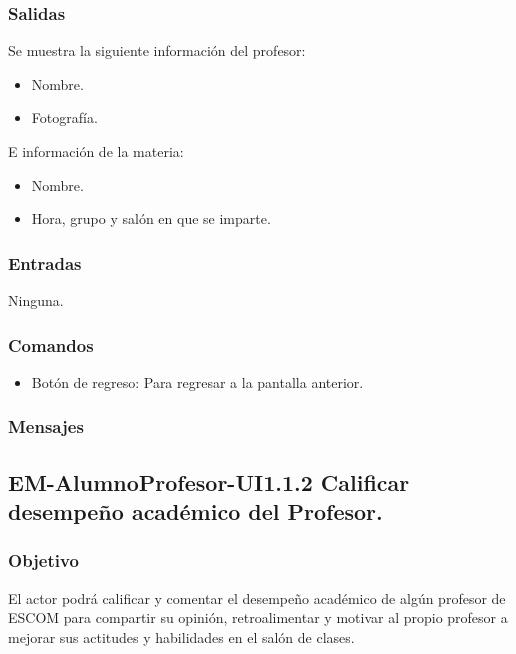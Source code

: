 \pagebreak
{}

\subsubsection{Salidas}
	\noindent
	Se muestra la siguiente información del profesor:
	\begin{itemize}
		\item Nombre.
		\item Fotografía. 
	\end{itemize}
	E información de la materia:
	\begin{itemize}
		\item Nombre.
		\item Hora, grupo y salón en que se imparte. 
	\end{itemize}

\subsubsection{Entradas}
	\noindent
	Ninguna.

\subsubsection{Comandos}
\begin{itemize}
	\item Botón de regreso: Para regresar a la pantalla anterior.
\end{itemize}

\subsubsection{Mensajes}
	\noindent


\newpage

\subsection{EM-AlumnoProfesor-UI1.1.2 Calificar desempeño académico del Profesor.}

\subsubsection{Objetivo}
	\noindent
	El actor podrá calificar y comentar el desempeño académico de algún profesor de ESCOM para compartir su opinión, retroalimentar y motivar al propio profesor a mejorar sus actitudes y habilidades en el salón de clases.

